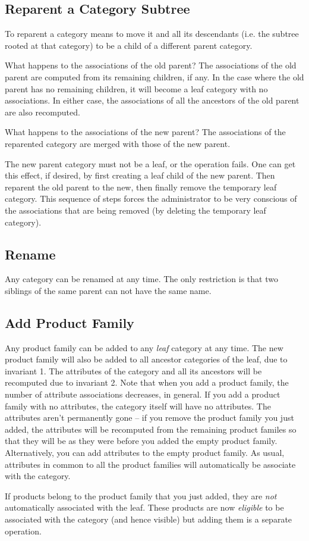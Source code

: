 \documentclass[letterpaper, 12pt]{article}
\begin{document}
\subsection{Reparent a Category Subtree}
To reparent a category means to move it and all its descendants (i.e. the subtree rooted at that category) to be a child of a different parent category. 
\par
What happens to the associations of the old parent?  The associations of the old parent are computed from its remaining children, if any.  In the case where the old parent has no remaining children, it will become a leaf category with no associations.  In either case, the associations of all the ancestors of the old parent are also recomputed.
\par
What happens to the associations of the new parent?  The associations of the reparented category are merged with those of the new parent.
\par
The new parent category must not be a leaf, or the operation fails.  One can get this effect, if desired, by first creating a leaf child of the new parent.  Then reparent the old parent to the new, then finally remove the temporary leaf category.  This sequence of steps forces the administrator to be very conscious of the associations that are being removed (by deleting the temporary leaf category).

\subsection{Rename}
Any category can be renamed at any time.  The only restriction is that two siblings of the same parent can not have the same name.  

\subsection{Add Product Family}
Any product family can be added to any {\em leaf} category at any time.  The new product family will also be added to all ancestor categories of the leaf, due to invariant 1.  The attributes of the category and all its ancestors will be recomputed due to invariant 2.  Note that when you add a product family, the number of attribute associations decreases, in general.  If you add a product family with no attributes, the category itself will have no attributes.  The attributes aren't permanently gone -- if you remove the product family you just added, the attributes will be recomputed from the remaining product familes so that they will be as they were before you added the empty product family.  Alternatively, you can add attributes to the empty product family.  As usual, attributes in common to all the product families will automatically be associate with the category.
\par
If products belong to the product family that you just added, they are {\em not} automatically associated with the leaf.  These products are now {\em eligible} to be associated with the category (and hence visible) but adding them is a separate operation.
\end{document}
